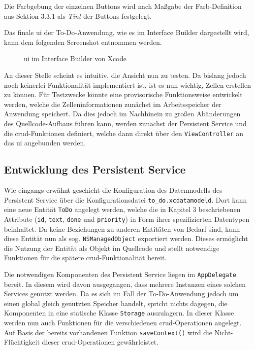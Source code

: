 Die Farbgebung der einzelnen Buttons wird nach Maßgabe der Farb-Definition aus Sektion 3.3.1 als \textit{Tint} der Buttons festgelegt.

Das finale \ac{ui} der To-Do-Anwendung, wie es im Interface Builder dargestellt wird, kann dem folgenden Screenshot entnommen werden.

\begin{figure}[h!]
	\centering
	\caption{\ac{ui} im Interface Builder von Xcode}
\end{figure}


An dieser Stelle scheint es intuitiv, die Ansicht nun zu testen. Da bislang jedoch noch keinerlei Funktionalität implementiert ist, ist es nun wichtig, Zellen erstellen zu können. Für Testzwecke könnte eine provisorische Funktionsweise entwickelt werden, welche die Zelleninformationen zunächst im Arbeitsspeicher der Anwendung speichert. Da dies jedoch im Nachhinein zu großen Abänderungen des Quellcode-Aufbaus führen kann, werden zunächst der Persistent Service und die \ac{crud}-Funktionen definiert, welche dann direkt über den \texttt{ViewController} an das \ac{ui} angebunden werden.

\subsection{Entwicklung des Persistent Service}
Wie eingangs erwähnt geschieht die Konfiguration des Datenmodells des Persistent Service über die Konfigurationsdatei \texttt{to\_do.xcdatamodeld}. Dort kann eine neue Entität \texttt{ToDo} angelegt werden, welche die in Kapitel 3 beschriebenen Attribute (\texttt{id}, \texttt{text}, \texttt{done} und \texttt{priority}) in Form ihrer spezifizierten Datentypen beinhaltet. Da keine Beziehungen zu anderen Entitäten von Bedarf sind, kann diese Entität nun als sog. \texttt{NSManagedObject} exportiert werden. Dieses ermöglicht die Nutzung der Entität als Objekt im Quellcode und stellt notwendige Funktionen für die spätere \ac{crud}-Funktionalität bereit.

Die notwendigen Komponenten des Persistent Service liegen im \texttt{AppDelegate} bereit. In diesem wird davon ausgegangen, dass mehrere Instanzen eines solchen Services genutzt werden. Da es sich im Fall der To-Do-Anwendung jedoch um einen global gleich genutzten Speicher handelt, spricht nichts dagegen, die Komponenten in eine statische Klasse \texttt{Storage} auszulagern. In dieser Klasse werden nun auch Funktionen für die verschiedenen \ac{crud}-Operationen angelegt. Auf Basis der bereits vorhandenen Funktion \texttt{saveContext()} wird die Nicht-Flüchtigkeit dieser \ac{crud}-Operationen gewährleistet.

